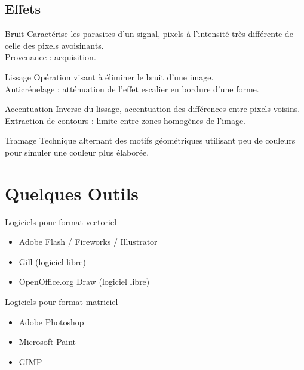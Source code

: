 \documentclass[14pt]{beamer}
\begin{document}
\subsection{Effets}
\begin{frame}[allowframebreaks]{\subsecname}
\begin{block}{Bruit}
Caractérise les parasites d'un signal, pixels à l'intensité très différente de celle des pixels avoisinants.\\
Provenance : acquisition.
\end{block}

\begin{block}{Lissage}
Opération visant à éliminer le bruit d'une image.\\
Anticrénelage : atténuation de l'effet escalier en bordure d'une forme.
\end{block}

\begin{block}{Accentuation}
Inverse du lissage, accentuation des différences entre pixels voisins.
Extraction de contours : limite entre zones homogènes de l'image.
\end{block}

\begin{block}{Tramage}
Technique alternant des motifs géométriques utilisant peu de couleurs pour simuler une couleur plus élaborée.
\end{block}

\end{frame}



\section{Quelques Outils}

\begin{frame}{\secname}
Logiciels pour format vectoriel
 \begin{itemize}
  \item Adobe Flash / Fireworks / Illustrator
  \item Gill (logiciel libre)
  \item OpenOffice.org Draw (logiciel libre)
 \end{itemize}
Logiciels pour format matriciel
 \begin{itemize}
  \item Adobe Photoshop
  \item Microsoft Paint
  \item GIMP
 \end{itemize}
\end{frame}
\end{document}

